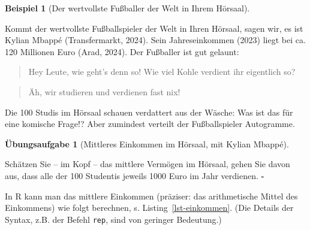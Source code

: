 \documentclass[
  letterpaper,
  oneside,
  open=any]{scrbook}
\theoremstyle{definition}
\newtheorem{exercise}{Übungsaufgabe}[chapter]
\theoremstyle{definition}
\newtheorem{example}{Beispiel}[chapter]
\theoremstyle{definition}
\theoremstyle{remark}
\begin{document}
\begin{example}[Der wertvollste Fußballer der Welt in Ihrem
Hörsaal]\protect\hypertarget{exm-md}{}\label{exm-md}

Kommt der wertvollste Fußballspieler der Welt in Ihren Hörsaal, sagen
wir, es ist Kylian Mbappé (Transfermarkt, 2024). Sein Jahreseinkommen
(2023) liegt bei ca. 120 Millionen Euro (Arad, 2024). Der Fußballer ist
gut gelaunt:

\begin{quote}
{} Hey Leute, wie geht's denn so! Wie viel Kohle
verdient ihr eigentlich so?
\end{quote}

\begin{quote}
{} Äh, wir studieren und verdienen fast nix!
\end{quote}

Die 100 Studis im Hörsaal schauen verdattert aus der Wäsche: Was ist das
für eine komische Frage!? Aber zumindest verteilt der Fußballspieler
Autogramme.

\end{example}

\begin{exercise}[Mittleres Einkommen im Hörsaal, mit Kylian
Mbappé]\protect\hypertarget{exr-elon}{}\label{exr-elon}

Schätzen Sie -- im Kopf -- das mittlere Vermögen im Hörsaal, gehen Sie
davon aus, dass alle der 100 Studentis jeweils 1000 Euro im Jahr
verdienen. \(\square\)

\end{exercise}

In R kann man das mittlere Einkommen (präziser: das arithmetische Mittel
des Einkommens) wie folgt berechnen, s. Listing~\ref{lst-einkommen}.
(Die Details der Syntax, z.B. der Befehl \texttt{rep}, sind von geringer
Bedeutung.)
\end{document}
